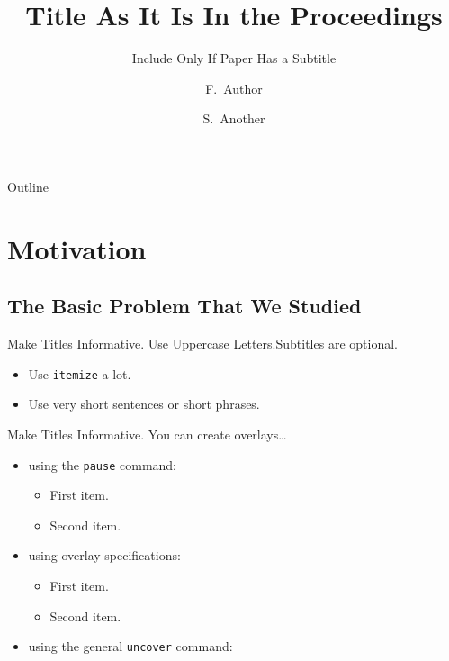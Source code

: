 \documentclass{beamer}
\title[Short Paper Title]{Title As It Is In the Proceedings}
\subtitle{Include Only If Paper Has a Subtitle}
\author[Author, Another]{F.~Author\inst{1} \and S.~Another\inst{2}}
\date{}%
\begin{document}
\firstpage


\begin{frame}{Outline}
  \tableofcontents
\end{frame}


\section{Motivation}

\subsection{The Basic Problem That We Studied}

\begin{frame}{Make Titles Informative. Use Uppercase Letters.}{Subtitles are optional.}
  \begin{itemize}
  \item
    Use \texttt{itemize} a lot.
  \item
    Use very short sentences or short phrases.
  \end{itemize}
\end{frame}

\begin{frame}{Make Titles Informative.}
  You can create overlays\dots
  \begin{itemize}
  \item using the \texttt{pause} command:
    \begin{itemize}
    \item
      First item.
      \pause
    \item    
      Second item.
    \end{itemize}
  \item
    using overlay specifications:
    \begin{itemize}
    \item<3->
      First item.
    \item<4->
      Second item.
    \end{itemize}
  \item
    using the general \texttt{uncover} command:
    \begin{itemize}
    \end{itemize}
  \end{itemize}
\end{frame}
\end{document}
